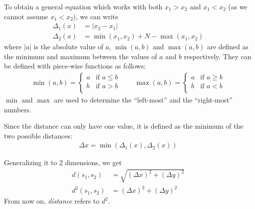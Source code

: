To obtain a general equation which works with both $x_1>x_2$ and $x_1<x_2$ (as we cannot assume $x_1<x_2$), we can write
\begin{align*}
    \Delta_1(x)&=\lvert x_2-x_1 \rvert \\
    \Delta_2(x)&=\min{(x_1,x_2)}+N-\max{(x_1,x_2)}
\end{align*}
where $\lvert a\rvert$ is the absolute value of $a$, $\min{(a,b)}$ and $\max{(a,b)}$ are defined as the minimum and maximum between the values of $a$ and $b$ respectively. They can be defined with piece-wise functions as follows:
\begin{align*}
        \min{(a,b)}=
        \begin{cases}
            a&\text{if $a\leq b$}\\
            b&\text{if $a>b$}\\
        \end{cases}\qquad
        \max{(a,b)}=
        \begin{cases}
            a&\text{if $a\geq b$}\\
            b&\text{if $a<b$}\\
        \end{cases}
\end{align*}
$\min$ and $\max$ are used to determine the  ``left-most'' and the ``right-most'' numbers.

Since the distance can only have one value, it is defined as the minimum of the two possible distances:
\begin{align*}
    \Delta x=\min{(\Delta_1(x),\Delta_2(x))}
\end{align*}

Generalizing it to 2 dimensions, we get
\begin{align*}
    d(s_1,s_2)&=\sqrt{(\Delta x)^2+(\Delta y)^2} \\
    d^2(s_1,s_2)&=(\Delta x)^2+(\Delta y)^2
\end{align*}
From now on, \emph{distance} refers to $d^2$.

